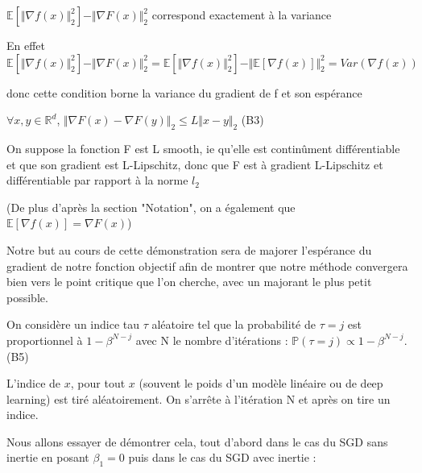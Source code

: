 \documentclass{article}
\begin{document}
\bigskip

 $\mathbb{E}[ \Vert \nabla f(x) \Vert ^2_2]-  \Vert \nabla F(x)  \Vert ^2_2 $ correspond exactement à la variance

En effet
 $\mathbb{E}[ \Vert \nabla f(x) \Vert ^2_2]-  \Vert \nabla F(x)  \Vert ^2_2 = \mathbb{E}[ \Vert \nabla f(x) \Vert ^2_2]-  \Vert \mathbb{E}[\nabla f(x)]  \Vert ^2_2= Var(\nabla f(x))$ 
 
 donc cette condition borne la variance du gradient de f et son espérance
  
\bigskip


\bigskip

\begin{assumption}

 $\forall x,y \in \mathbb{R}^d$, $  \Vert  \nabla F(x) - \nabla F(y) \Vert _2 \leq L  \Vert x-y \Vert _2$ \hspace{\fill} (B3) 
\bigskip

On suppose la fonction F est L smooth, ie qu'elle est continûment différentiable et que son gradient est L-Lipschitz, donc que F est à gradient L-Lipschitz et différentiable par rapport à la norme $l_2$

\bigskip


\end{assumption}

\bigskip

(De plus d'après la section "Notation", on a également que $\mathbb{E}[\nabla f(x)]= \nabla F(x)$)

\bigskip

Notre but au cours de cette démonstration sera de majorer l'espérance du gradient de notre fonction objectif afin de montrer que notre méthode convergera bien vers le point critique que l'on cherche, avec un majorant le plus petit possible.

\bigskip

On considère un indice tau $\tau$ aléatoire tel que la probabilité de $\tau= j$ est proportionnel à $1-\beta^{N-j}$ avec N le nombre d'itérations : $\mathbb{P}(\tau = j) \propto 1- \beta^{N-j}$. \hspace{\fill}(B5)

L'indice de $x$, pour tout $x$ (souvent le poids d'un modèle linéaire ou de deep learning) est tiré aléatoirement. On s'arrête à l'itération N et après on tire un indice.
\bigskip

Nous allons essayer de démontrer cela, tout d'abord dans le cas du SGD sans inertie en posant $\beta_1=0$ puis dans le cas du SGD avec inertie :
\end{document}
